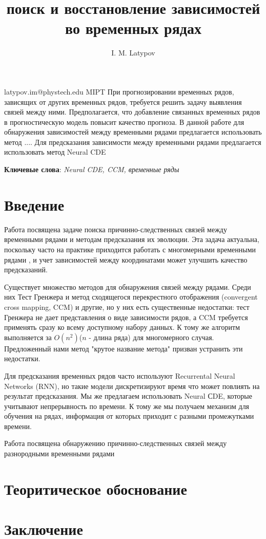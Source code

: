 \documentclass[12pt, twoside]{article}
\begin{document}
\title
	[поиск и восстановление зависимостей во временных рядах]
	{поиск и восстановление зависимостей во временных рядах}
\author
	[I. M. Latypov]
	{I. M. Latypov}
\email
	{latypov.im@phystech.edu}
\organization	
	{MIPT}	
\abstract
	{
		При прогнозировании временных рядов, зависящих от других временных рядов, требуется решить задачу выявления связей между ними.
		Предполагается, что добавление связанных временных рядов в прогностическую модель повысит качество прогноза. В данной работе для
		обнаружения зависимостей между временными рядами предлагается использовать метод .... Для предсказания зависимости между временными 
		рядами предлагается использовать метод Neural CDE
		}
\bigskip
\noindent

\maketitle
\textbf{Ключевые слова}: \emph{Neural CDE, CCM, временные ряды}

\section{Введение}
	Работа посвящена задаче поиска причинно-следственных связей между временными рядами и методам предсказания их эволюции.
	Эта задача актуальна, поскольку часто на практике приходится работать с многомерными временными рядами \citep{dataset_mlru}, и учет зависимостей между координатами может улучшить качество предсказаний. 
		
	Существует множество методов для обнаружения связей между рядами. Среди них Тест Гренжера и метод сходящегося перекрестного отображения
	(convergent cross mapping, CCM) и другие, но у них есть существенные недостатки: тест Гренжера не дает
	представления о виде зависимости рядов, а CCM требуется применять сразу ко всему доступному набору данных. К тому же алгоритм
	выполняется за $O(n^2)$($n$ - длина ряда) для многомерного случая. Предложенный нами метод "крутое название метода" призван устранить эти недостатки.
	
	Для предсказания временных рядов часто используют Recurrental Neural Networks (RNN), но такие модели дискретизируют время
	что может повлиять на результат предсказания. Мы же предлагаем использовать Neural СDE, которые учитывают непрерывность
	по времени. К тому же мы получаем механизм для обучения на рядах, информация от которых приходит с разными промежутками времени.
	
	
	Работа посвящена обнаружению причинно-следственных связей между разнородными временными рядами


\section{Теоритическое обоснование}
	
\section{Заключение}



	
	
\end{document}
